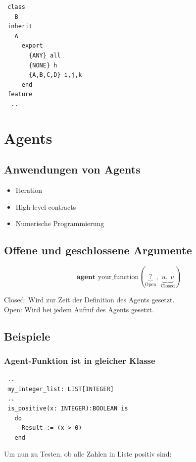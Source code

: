 \documentclass[german, 10pt, a4paper, twocolumn]{scrartcl}
\theoremstyle{definition}
\begin{document}
\begin{verbatim}
 class
   B
 inherit
   A
     export
       {ANY} all
       {NONE} h
       {A,B,C,D} i,j,k
     end
 feature
  ..
\end{verbatim}

\section{Agents}


\subsection{Anwendungen von Agents}

\begin{itemize}
	\item Iteration
	\item High-level contracts
	\item Numerische Programmierung
\end{itemize}

\subsection{Offene und geschlossene Argumente}

\begin{displaymath}
	\textbf{agent } \mbox{your\_function}(\underbrace{?}_{\mbox{Open}},\ \underbrace{u,\ v}_{\mbox{Closed}})
\end{displaymath}

Closed: Wird zur Zeit der Definition des Agents gesetzt.\\
Open: Wird bei jedem Aufruf des Agents gesetzt.

\subsection{Beispiele}

\subsubsection{Agent-Funktion ist in gleicher Klasse}

\begin{verbatim}
 ..
 my_integer_list: LIST[INTEGER]
 ..
 is_positive(x: INTEGER):BOOLEAN is
   do
     Result := (x > 0)
   end
\end{verbatim}

Um nun zu Testen, ob alle Zahlen in Liste positiv sind:
\end{document}
